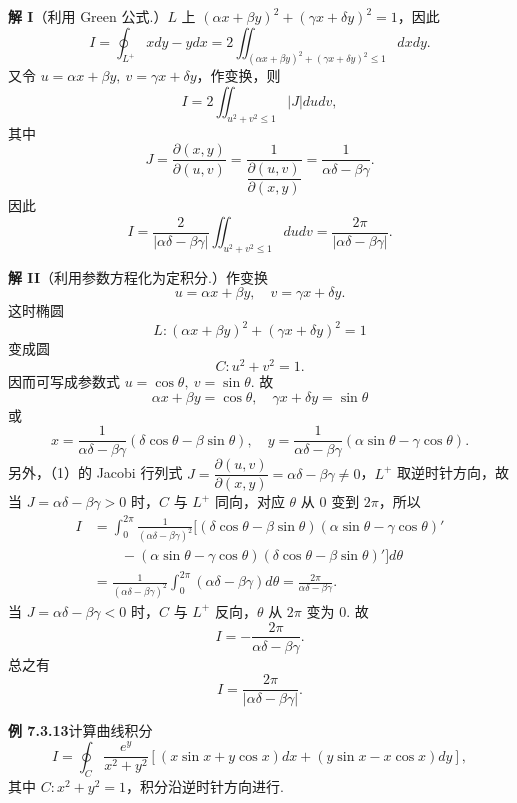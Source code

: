 \documentclass[UTF8,12pt,a4paper,fontset=fandol]{ctexart}
\begin{document}
\noindent\textbf{解 I}\quad （利用 Green 公式.）$L$ 上 $(\alpha x+\beta y)^2+(\gamma x+\delta y)^2=1$，因此
\[
I=\oint_{L^+}xdy-ydx
=2\iint_{(\alpha x+\beta y)^2+(\gamma x+\delta y)^2\le1}dxdy.
\]
又令 $u=\alpha x+\beta y,\ v=\gamma x+\delta y$，作变换，则
\[
I=2\iint_{u^2+v^2\le1}|J|dudv,
\]
其中
\[
J=\frac{\partial(x,y)}{\partial(u,v)}
=\frac1{\dfrac{\partial(u,v)}{\partial(x,y)}}
=\frac1{\alpha\delta-\beta\gamma}.
\]
因此
\[
I=\frac2{|\alpha\delta-\beta\gamma|}
\iint_{u^2+v^2\le1}dudv
=\frac{2\pi}{|\alpha\delta-\beta\gamma|}.
\]

\noindent\textbf{解 II}\quad （利用参数方程化为定积分.）作变换
\[
u=\alpha x+\beta y,\quad v=\gamma x+\delta y. \tag{1}
\]
这时椭圆
\[
L:(\alpha x+\beta y)^2+(\gamma x+\delta y)^2=1
\]
变成圆
\[
C:u^2+v^2=1.
\]
因而可写成参数式 $u=\cos\theta,\ v=\sin\theta$. 故
\[
\alpha x+\beta y=\cos\theta,\quad \gamma x+\delta y=\sin\theta
\]
或
\[
x=\frac1{\alpha\delta-\beta\gamma}(\delta\cos\theta-\beta\sin\theta),\quad
y=\frac1{\alpha\delta-\beta\gamma}(\alpha\sin\theta-\gamma\cos\theta).
\]
另外，（1）的 Jacobi 行列式 $J=\dfrac{\partial(u,v)}{\partial(x,y)}
=\alpha\delta-\beta\gamma\ne0$，$L^+$ 取逆时针方向，故当 $J=\alpha\delta-\beta\gamma>0$ 时，$C$ 与 $L^+$ 同向，对应 $\theta$ 从 $0$ 变到 $2\pi$，所以
\[
\begin{aligned}
I&=\int_0^{2\pi}\frac1{(\alpha\delta-\beta\gamma)^2}
\bigl[(\delta\cos\theta-\beta\sin\theta)(\alpha\sin\theta-\gamma\cos\theta)'\\
&\qquad
-(\alpha\sin\theta-\gamma\cos\theta)(\delta\cos\theta-\beta\sin\theta)'\bigr]d\theta\\
&=\frac1{(\alpha\delta-\beta\gamma)^2}
\int_0^{2\pi}(\alpha\delta-\beta\gamma)d\theta
=\frac{2\pi}{\alpha\delta-\beta\gamma}.
\end{aligned}
\]
当 $J=\alpha\delta-\beta\gamma<0$ 时，$C$ 与 $L^+$ 反向，$\theta$ 从 $2\pi$ 变为 $0$. 故
\[
I=-\frac{2\pi}{\alpha\delta-\beta\gamma}.
\]
总之有
\[
I=\frac{2\pi}{|\alpha\delta-\beta\gamma|}.
\]

\noindent\textbf{例 7.3.13}\quad 计算曲线积分
\[
I=\oint_C\frac{e^y}{x^2+y^2}
[(x\sin x+y\cos x)dx+(y\sin x-x\cos x)dy],
\]
其中 $C:x^2+y^2=1$，积分沿逆时针方向进行.
\end{document}

